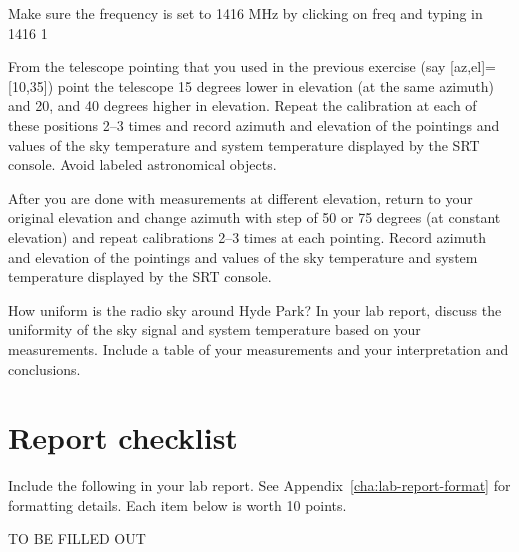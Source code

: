 \begin{steps}
	\item Make sure the frequency is set to 1416 MHz by clicking on freq and typing
	in 1416 1
	
	\item From the telescope pointing that you used in the previous exercise (say
	[az,el]=[10,35]) point the telescope 15 degrees lower in elevation (at the
	same azimuth) and 20, and 40 degrees higher in elevation. Repeat the
	calibration at each of these positions 2--3 times and record azimuth and
	elevation of the pointings and values of the sky temperature and system
	temperature displayed by the SRT console. Avoid labeled astronomical
	objects.

	\item After you are done with measurements at different elevation, return to your
	original elevation and change azimuth with step of 50 or 75 degrees (at
	constant elevation) and repeat calibrations 2--3 times at each pointing.
	Record azimuth and elevation of the pointings and values of the sky
	temperature and system temperature displayed by the SRT console.
	
	\item How uniform is the radio sky around Hyde Park? In your lab report,
	discuss the uniformity of the sky signal and system temperature based on
	your measurements. Include a table of your measurements and your
	interpretation and conclusions.
\end{steps}

\section{Report checklist}

Include the following in your lab report. See Appendix~\ref{cha:lab-report-format} for formatting details. Each item below is worth 10 points.

TO BE FILLED OUT
